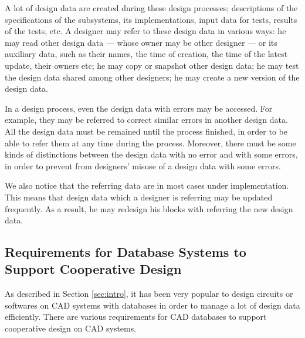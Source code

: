 A lot of design data are created during these design processes; 
descriptions of the specifications of the subsystems, its
implementations, input data for tests, results of the tests, etc.
A designer
may refer to these design data in various ways: 
he may read other design data ---
whose owner may be other designer --- or its auxiliary data,
such as their names, the time of creation, the time of the latest
update, their owners etc; he may copy or snapshot other design data; he may test
the design data shared among other designers; he may create a new
version of the design data. 

In a design process, even the design data with errors may be accessed.
For example, they may be referred to correct similar errors in another
design data.
All the design data must be remained until the process finished, in
order to be able to refer them at any time during the process.
Moreover, there must be some kinds of distinctions between the design
data with no error and with some errors, in order to prevent from
designers' misuse of a design data with some errors.

We also notice that the referring data are in most cases under
implementation.
This means that design data which a designer is referring may be updated
frequently.
As a result, he may redesign his blocks with referring the new design data.

\subsection{Requirements for Database Systems to Support Cooperative
Design}
\label{subsec:require}
As described in Section \ref{sec:intro}, it has been very popular to
design circuits or softwares on CAD systems with databases in order to
manage a lot of design data efficiently.
There are various requirements for CAD databases to support
cooperative design on CAD systems.


